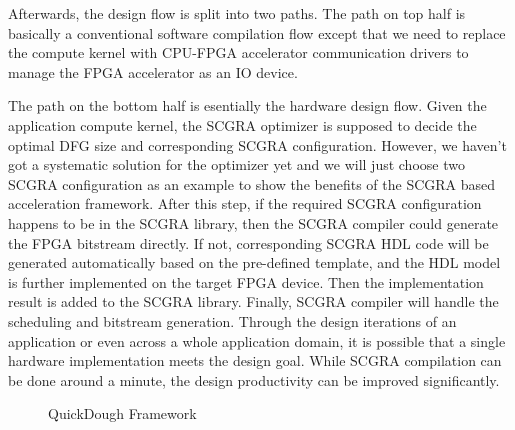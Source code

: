 Afterwards, the design flow is split into two paths. The path on top half is basically a conventional software compilation flow except that we need to replace the compute kernel with CPU-FPGA accelerator communication drivers to manage the FPGA accelerator as an IO device. 

The path on the bottom half is esentially the hardware design flow. Given the application compute kernel, the SCGRA optimizer is supposed to decide the optimal DFG size and corresponding SCGRA configuration. However, we haven't got a systematic solution for the optimizer yet and we will just choose two SCGRA configuration as an example to show the benefits of the SCGRA based acceleration framework. After this step, if the required SCGRA configuration happens to be in the SCGRA library, then the SCGRA compiler could generate the FPGA bitstream directly. If not, corresponding SCGRA HDL code will be generated automatically based on the pre-defined template, and the HDL model is further implemented on the target FPGA device. Then the implementation result is added to the SCGRA library. Finally, SCGRA compiler will handle the scheduling and bitstream generation. Through the design iterations of an application or even across a whole application domain, it is possible that a single hardware implementation meets the design goal. While SCGRA compilation can be done around a minute, the design productivity can be improved significantly. 

\begin{figure}[H]
    \caption{QuickDough Framework}
    \label{fig:framework}
\end{figure}


